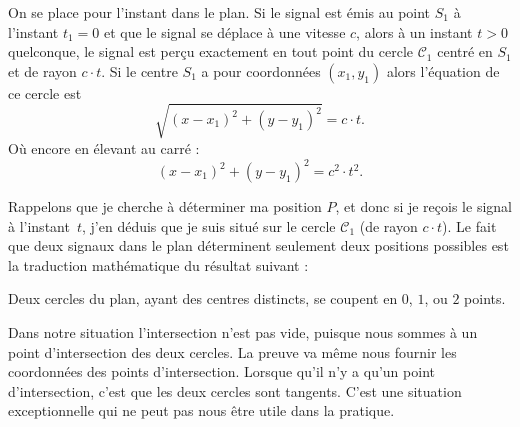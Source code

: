 \documentclass[class=report,crop=false]{standalone}
\begin{document}

On se place pour l'instant dans le plan. Si le signal est émis au point $S_1$
à l'instant $t_1=0$ et que le signal se déplace à une vitesse $c$, alors à un instant $t>0$ quelconque,
le signal est perçu exactement en tout point du cercle $\mathcal{C}_1$ centré en $S_1$ et de rayon $c \cdot t$.
Si le centre $S_1$ a pour coordonnées $(x_1,y_1)$ alors l'équation de ce cercle est
$$\sqrt{(x-x_1)^2 + (y-y_1)^2} = c \cdot t.$$
Où encore en élevant au carré :
$$(x-x_1)^2 + (y-y_1)^2 = c^2 \cdot t^2.$$

Rappelons que je cherche à déterminer ma position $P$, et donc si je reçois le signal 
à l'instant~$t$, j'en déduis que je suis situé sur le cercle $\mathcal{C}_1$ (de rayon $c\cdot t$).
Le fait que deux signaux dans le plan déterminent seulement deux positions possibles 
est la traduction mathématique du résultat suivant :
\begin{proposition}
Deux cercles du plan, ayant des centres distincts, se coupent en $0$, $1$, ou $2$ points.  
\end{proposition}


Dans notre situation l'intersection n'est pas vide, puisque nous sommes
à un point d'intersection des deux cercles.
La preuve va même nous fournir les coordonnées des points d'intersection.
Lorsque qu'il n'y a qu'un point d'intersection, c'est que les deux cercles sont tangents.
C'est une situation exceptionnelle qui ne peut pas nous être utile dans la pratique.
\end{document}
